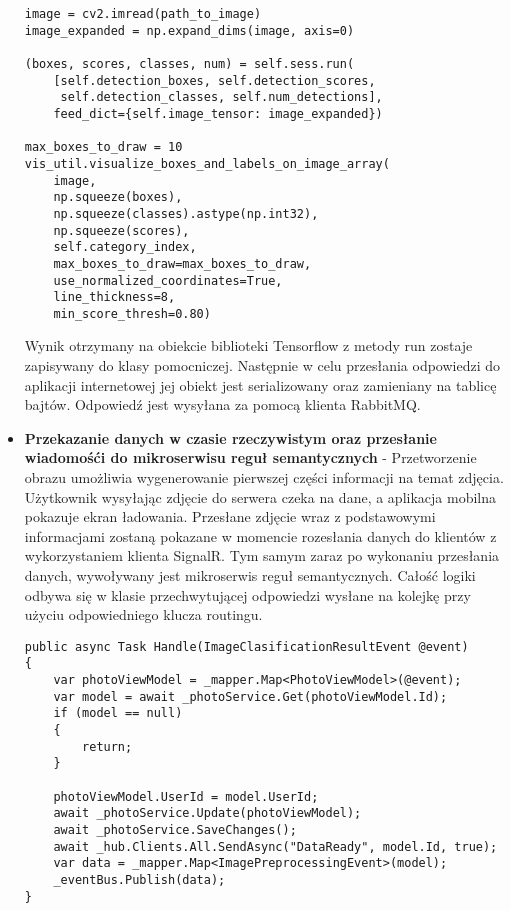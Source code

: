 \begin{itemize}
\begin{lstlisting}[caption={Detekcja przedmiotów na obrazie.}]
image = cv2.imread(path_to_image)
image_expanded = np.expand_dims(image, axis=0)

(boxes, scores, classes, num) = self.sess.run(
	[self.detection_boxes, self.detection_scores,
	 self.detection_classes, self.num_detections],
	feed_dict={self.image_tensor: image_expanded})

max_boxes_to_draw = 10
vis_util.visualize_boxes_and_labels_on_image_array(
	image,
	np.squeeze(boxes),
	np.squeeze(classes).astype(np.int32),
	np.squeeze(scores),
	self.category_index,
	max_boxes_to_draw=max_boxes_to_draw,
	use_normalized_coordinates=True,
	line_thickness=8,
	min_score_thresh=0.80)
\end{lstlisting}

Wynik otrzymany na obiekcie biblioteki Tensorflow z metody run zostaje zapisywany do klasy pomocniczej. Następnie w celu przesłania odpowiedzi do aplikacji internetowej jej obiekt jest serializowany oraz zamieniany na tablicę bajtów. Odpowiedź jest wysyłana za pomocą klienta RabbitMQ.
\newline

\item \textbf{Przekazanie danych w czasie rzeczywistym oraz przesłanie wiadomośći do mikroserwisu reguł semantycznych} - Przetworzenie obrazu umożliwia wygenerowanie pierwszej części informacji na temat zdjęcia. Użytkownik wysyłając zdjęcie do serwera czeka na dane, a aplikacja mobilna pokazuje ekran ładowania. Przesłane zdjęcie wraz z podstawowymi informacjami zostaną pokazane w momencie rozesłania danych do klientów z wykorzystaniem klienta SignalR. Tym samym zaraz po wykonaniu przesłania danych, wywoływany jest mikroserwis reguł semantycznych. Całość logiki odbywa się w klasie przechwytującej odpowiedzi wysłane na kolejkę przy użyciu odpowiedniego klucza routingu.

\begin{lstlisting}[caption={Przekazanie danych do aplikacji mobilnej oraz .}]
public async Task Handle(ImageClasificationResultEvent @event)
{
	var photoViewModel = _mapper.Map<PhotoViewModel>(@event);
	var model = await _photoService.Get(photoViewModel.Id);
	if (model == null)
	{
		return;
	}
	
	photoViewModel.UserId = model.UserId;
	await _photoService.Update(photoViewModel);
	await _photoService.SaveChanges();
	await _hub.Clients.All.SendAsync("DataReady", model.Id, true);
	var data = _mapper.Map<ImagePreprocessingEvent>(model);
	_eventBus.Publish(data);
}
\end{lstlisting}

\end{itemize}
